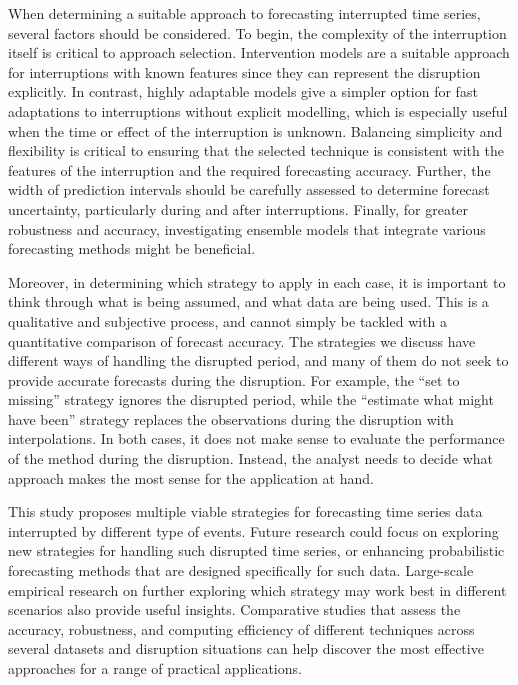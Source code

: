 \documentclass[
  11pt,
  a4paper,
]{article}
\begin{document}
When determining a suitable approach to forecasting interrupted time
series, several factors should be considered. To begin, the complexity
of the interruption itself is critical to approach selection.
Intervention models are a suitable approach for interruptions with known
features since they can represent the disruption explicitly. In
contrast, highly adaptable models give a simpler option for fast
adaptations to interruptions without explicit modelling, which is
especially useful when the time or effect of the interruption is
unknown. Balancing simplicity and flexibility is critical to ensuring
that the selected technique is consistent with the features of the
interruption and the required forecasting accuracy. Further, the width
of prediction intervals should be carefully assessed to determine
forecast uncertainty, particularly during and after interruptions.
Finally, for greater robustness and accuracy, investigating ensemble
models that integrate various forecasting methods might be beneficial.

Moreover, in determining which strategy to apply in each case, it is
important to think through what is being assumed, and what data are
being used. This is a qualitative and subjective process, and cannot
simply be tackled with a quantitative comparison of forecast accuracy.
The strategies we discuss have different ways of handling the disrupted
period, and many of them do not seek to provide accurate forecasts
during the disruption. For example, the ``set to missing'' strategy
ignores the disrupted period, while the ``estimate what might have
been'' strategy replaces the observations during the disruption with
interpolations. In both cases, it does not make sense to evaluate the
performance of the method during the disruption. Instead, the analyst
needs to decide what approach makes the most sense for the application
at hand.

This study proposes multiple viable strategies for forecasting time
series data interrupted by different type of events. Future research
could focus on exploring new strategies for handling such disrupted time
series, or enhancing probabilistic forecasting methods that are designed
specifically for such data. Large-scale empirical research on further
exploring which strategy may work best in different scenarios also
provide useful insights. Comparative studies that assess the accuracy,
robustness, and computing efficiency of different techniques across
several datasets and disruption situations can help discover the most
effective approaches for a range of practical applications.
\end{document}
